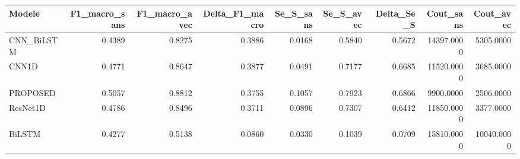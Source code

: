 \begin{tabular}{lrrrrrrrr}
\toprule
Modele & F1_macro_sans & F1_macro_avec & Delta_F1_macro & Se_S_sans & Se_S_avec & Delta_Se_S & Cout_sans & Cout_avec \\
\midrule
CNN_BiLSTM & 0.4389 & 0.8275 & 0.3886 & 0.0168 & 0.5840 & 0.5672 & 14397.0000 & 5305.0000 \\
CNN1D & 0.4771 & 0.8647 & 0.3877 & 0.0491 & 0.7177 & 0.6685 & 11520.0000 & 3685.0000 \\
PROPOSED & 0.5057 & 0.8812 & 0.3755 & 0.1057 & 0.7923 & 0.6866 & 9900.0000 & 2506.0000 \\
ResNet1D & 0.4786 & 0.8496 & 0.3711 & 0.0896 & 0.7307 & 0.6412 & 11850.0000 & 3377.0000 \\
BiLSTM & 0.4277 & 0.5138 & 0.0860 & 0.0330 & 0.1039 & 0.0709 & 15810.0000 & 10040.0000 \\
\bottomrule
\end{tabular}
